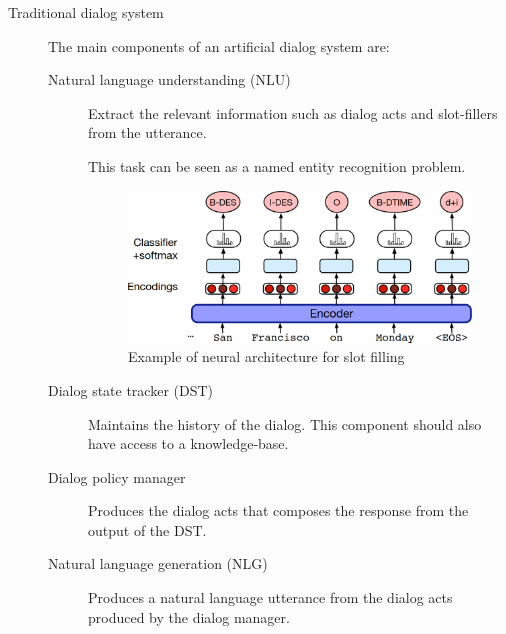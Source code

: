 \begin{description}
    \item[Traditional dialog system] 
        The main components of an artificial dialog system are:
        \begin{description}
            \item[Natural language understanding (NLU)] 
                Extract the relevant information such as dialog acts and slot-fillers from the utterance.

                \begin{remark}
                    This task can be seen as a named entity recognition problem.
                \end{remark}

                \begin{figure}[H]
                    \centering
                    \includegraphics[width=0.45\linewidth]{./img/nlu_arch.png}
                    \caption{Example of neural architecture for slot filling}
                \end{figure}

            \item[Dialog state tracker (DST)] 
                Maintains the history of the dialog. This component should also have access to a knowledge-base.

            \item[Dialog policy manager] 
                Produces the dialog acts that composes the response from the output of the DST.

            \item[Natural language generation (NLG)] 
                Produces a natural language utterance from the dialog acts produced by the dialog manager.
        \end{description}


\end{description}
